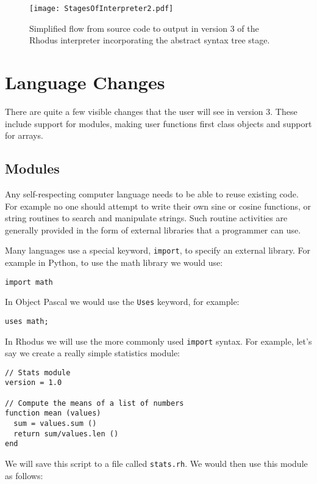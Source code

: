\begin{figure}[htpb]
\centering
\texttt{[image: StagesOfInterpreter2.pdf]}
\caption{Simplified flow from source code to output in version 3 of the Rhodus interpreter incorporating the abstract syntax tree stage.}
\label{fig:simpleInterpreter2}
\end{figure}

\section{Language Changes}

There are quite a few  visible changes that the user will see in version 3. These include support for modules, making user functions first class objects and support for arrays.

\subsection{Modules}

Any self-respecting computer language needs to be able to reuse existing code. For example no one should attempt to write their own sine or cosine functions, or string routines to search and manipulate strings. Such routine activities are generally provided in the form of external libraries that a programmer can use.

Many languages use a special keyword, {\tt import}, to specify an external library. For example in Python, to use the math library we would use:

\begin{lstlisting}
import math
\end{lstlisting}

In Object Pascal we would use the {\tt Uses} keyword, for example:

\begin{lstlisting}
uses math;
\end{lstlisting}

In Rhodus we will use the more commonly used {\tt import} syntax. For example, let's say we create a really simple statistics module:

\begin{lstlisting}
// Stats module
version = 1.0

// Compute the means of a list of numbers
function mean (values)
  sum = values.sum ()
  return sum/values.len ()
end
\end{lstlisting}

We will save this script to a file called {\tt stats.rh}. We would then use this module as follows:

